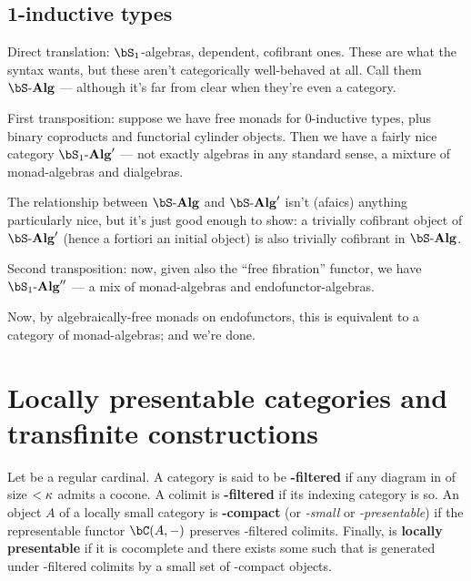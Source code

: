 \documentclass{amsart}
\newcommand{\Alg}[1]{{#1}\text{-}\mathbf{Alg}}
\begin{document}

\subsection{1-inductive types}


Direct translation: $\bS_1$-algebras, dependent, cofibrant ones.  These are what the syntax wants, but these aren’t categorically well-behaved at all.  Call them $\Alg{\bS}$ — although it’s far from clear when they’re even a category.

First transposition: suppose we have free monads for 0-inductive types, plus binary coproducts and functorial cylinder objects.  Then we have a fairly nice category $\Alg{\bS_1}'$ — not exactly algebras in any standard sense, a mixture of monad-algebras and dialgebras.  

The relationship between $\Alg{\bS}$ and $\Alg{\bS}'$ isn’t (afaics) anything particularly nice, but it’s just good enough to show: a trivially cofibrant object of $\Alg{\bS}'$ (hence a fortiori an initial object) is also trivially cofibrant in $\Alg{\bS}$.

Second transposition: now, given also the “free fibration” functor, we have $\Alg{\bS_1}''$ — a mix of monad-algebras and endofunctor-algebras.

Now, by algebraically-free monads on endofunctors, this is equivalent to a category of monad-algebras; and we’re done.


\section{Locally presentable categories and transfinite constructions}
\label{sec:lpres}

Let \ka be a regular cardinal.
A category \bI is said to be \textbf{\ka-filtered} if any diagram in \bI of size $<\kappa$ admits a cocone.
A colimit is \textbf{\ka-filtered} if its indexing category is so.
An object $A$ of a locally small category \bC is \textbf{\ka-compact} (or \emph{\ka-small} or \emph{\ka-presentable}) if the representable functor $\bC(A,-)$ preserves \ka-filtered colimits.
Finally, \bC is \textbf{locally presentable} if it is cocomplete and there exists some \ka such that \bC is generated under \ka-filtered colimits by a small set of \ka-compact objects.
\end{document}
